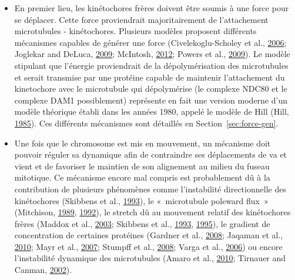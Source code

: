 \documentclass[12pt,a4paper,twoside,openright]{book}
\begin{document}
\begin{itemize}
\item
  En premier lieu, les kinétochores frères doivent être soumis à une
  force pour se déplacer. Cette force proviendrait majoritairement de
  l'attachement microtubules - kinétochores. Plusieurs modèles proposent
  différents mécanismes capables de générer une force
  (Civelekoglu-Scholey et al.,
  \protect\hyperlink{ref-Civelekoglu-Scholey2006}{2006}; Joglekar and
  DeLuca, \protect\hyperlink{ref-Joglekar2009}{2009}; McIntosh,
  \protect\hyperlink{ref-McIntosh2012}{2012}; Powers et al.,
  \protect\hyperlink{ref-Powers2009a}{2009}). Le modèle stipulant que
  l'énergie proviendrait de la dépolymérisation des microtubules et
  serait transmise par une protéine capable de maintenir l'attachement
  du kinetochore avec le microtubule qui dépolymérise (le complexe NDC80
  et le complexe DAM1 possiblement) représente en fait une version
  moderne d'un modèle théorique établi dans les années 1980, appelé le
  modèle de Hill (Hill, \protect\hyperlink{ref-Hill1985}{1985}). Ces
  différents mécanismes sont détaillés en Section~\ref{sec:force-gen}.
\item
  Une fois que le chromosome est mis en mouvement, un mécanisme doit
  pouvoir réguler sa dynamique afin de contraindre ses déplacements de
  va et vient et de favoriser le maintien de son alignement au milieu du
  fuseau mitotique. Ce mécanisme encore mal compris est probablement dû
  à la contribution de plusieurs phénomènes comme l'instabilité
  directionnelle des kinétochores (Skibbens et al.,
  \protect\hyperlink{ref-Skibbens1993}{1993}), le «~microtubule poleward
  flux~» (Mitchison, \protect\hyperlink{ref-Mitchison1989}{1989},
  \protect\hyperlink{ref-Mitchison1992}{1992}), le stretch dû au
  mouvement relatif des kinétochores frères (Maddox et al.,
  \protect\hyperlink{ref-Maddox2003}{2003}; Skibbens et al.,
  \protect\hyperlink{ref-Skibbens1993}{1993},
  \protect\hyperlink{ref-Skibbens1995}{1995}), le gradient de
  concentration de certaines protéines (Gardner et al.,
  \protect\hyperlink{ref-Gardner2008a}{2008}; Jaqaman et al.,
  \protect\hyperlink{ref-Jaqaman2010}{2010}; Mayr et al.,
  \protect\hyperlink{ref-Mayr2007}{2007}; Stumpff et al.,
  \protect\hyperlink{ref-Stumpff2008}{2008}; Varga et al.,
  \protect\hyperlink{ref-Varga2006}{2006}) ou encore l'instabilité
  dynamique des microtubules (Amaro et al.,
  \protect\hyperlink{ref-Amaro2010a}{2010}; Tirnauer and Canman,
  \protect\hyperlink{ref-Tirnauer2002}{2002}).
\end{itemize}
\end{document}
